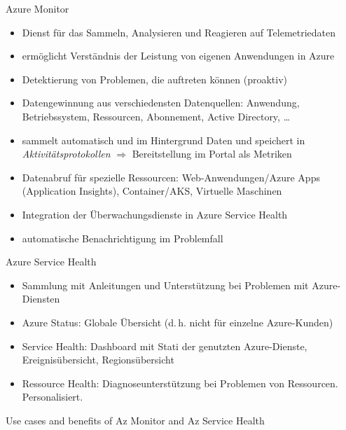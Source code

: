 
\begin{flashcard}[Describe]{Azure Monitor}
    \begin{itemize}
        \item Dienst für das Sammeln, Analysieren und Reagieren auf Telemetriedaten
        \item ermöglicht Verständnis der Leistung von eigenen Anwendungen in Azure
        \item Detektierung von Problemen, die auftreten können (proaktiv)
        \item Datengewinnung aus verschiedensten Datenquellen:\newline
            Anwendung, Betriebssystem, Ressourcen, Abonnement, Active Directory, \ldots
        \item sammelt automatisch und im Hintergrund Daten und speichert in \emph{Aktivitätsprotokollen}\newline
            $\Rightarrow$ Bereitstellung im Portal als Metriken
        \item Datenabruf für spezielle Ressourcen: Web-Anwendungen/Azure Apps (Application Insights), Container/AKS, Virtuelle Maschinen
        \item Integration der Überwachungsdienste in Azure Service Health
        \item automatische Benachrichtigung im Problemfall
    \end{itemize}

\end{flashcard}

\begin{flashcard}[Describe]{Azure Service Health}
    \begin{itemize}
        \item Sammlung mit Anleitungen und Unterstützung bei Problemen mit Azure-Diensten
        \item Azure Status:\newline
            Globale Übersicht (d.\,h. nicht für einzelne Azure-Kunden)
        \item Service Health:\newline
            Dashboard mit Stati der genutzten Azure-Dienste, Ereignisübersicht, Regionsübersicht
        \item Ressource Health:\newline
            Diagnoseunterstützung bei Problemen von Ressourcen. Personalisiert.
    \end{itemize}

\end{flashcard}

\begin{flashcard}[Understand]{Use cases and benefits of Az Monitor and Az Service Health}

\end{flashcard}
